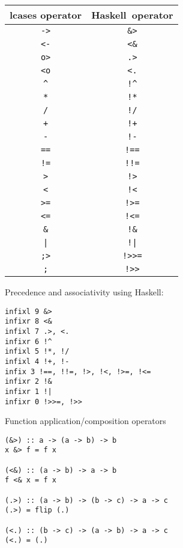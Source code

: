 \documentclass[diploma]{softlab-thesis}
\def\H{Haskell}
\begin{document}
\begin{table}[ht]
\hspace{0.5cm}
\begin{minipage}{0.45\linewidth}\centering
\begin{tabular}{ |c|c| }
\hline
lcases operator & \H\ operator
\\
\hline
\hline
\verb|->| & \verb|&>|
\\
\hline
\verb|<-| & \verb|<&|
\\
\hline
\verb|o>| & \verb|.>|
\\
\hline
\verb|<o| & \verb|<.|
\\
\hline
\verb|^| & \verb|!^|
\\
\hline
\verb|*| & \verb|!*|
\\
\hline
\verb|/| & \verb|!/|
\\
\hline
\verb|+| & \verb|!+|
\\
\hline
\verb|-| & \verb|!-|
\\
\hline
\verb|==| & \verb|!==|
\\
\hline
\verb|!=| & \verb|!!=|
\\
\hline
\verb|>| & \verb|!>|
\\
\hline
\verb|<| & \verb|!<|
\\
\hline
\verb|>=| & \verb|!>=|
\\
\hline
\verb|<=| & \verb|!<=|
\\
\hline
\verb|&| & \verb|!&|
\\
\hline
\texttt{|} & \texttt{!|}
\\
\hline
\verb|;>| & \verb|!>>=|
\\
\hline
\verb|;| & \verb|!>>|
\\
\hline
\end{tabular}
\end{minipage}
\hspace{1cm}
\begin{minipage}{0.45\linewidth}

Precedence and associativity using \H:
\begin{verbatim}
infixl 9 &>
infixr 8 <&
infixl 7 .>, <.
infixr 6 !^
infixl 5 !*, !/
infixl 4 !+, !-
infix 3 !==, !!=, !>, !<, !>=, !<=
infixr 2 !&
infixr 1 !|
infixr 0 !>>=, !>>
\end{verbatim}

Function application/composition operators
\begin{verbatim}
(&>) :: a -> (a -> b) -> b
x &> f = f x

(<&) :: (a -> b) -> a -> b
f <& x = f x

(.>) :: (a -> b) -> (b -> c) -> a -> c
(.>) = flip (.)

(<.) :: (b -> c) -> (a -> b) -> a -> c
(<.) = (.)
\end{verbatim}
\end{minipage}
\end{table}
\end{document}
